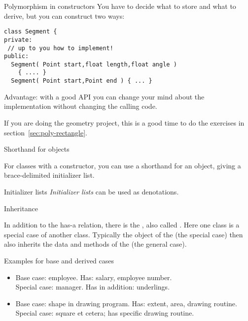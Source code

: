 \begin{slide}{Polymorphism in constructors}
  \label{sl:obj-poly-construct}
  You have to decide what to store and what to derive, but you can
  construct two ways:
\begin{lstlisting}
class Segment {
private:
 // up to you how to implement!
public:
  Segment( Point start,float length,float angle )
    { .... }
  Segment( Point start,Point end ) { ... }
\end{lstlisting}
Advantage: with a good API you can change your mind about the
implementation without changing the calling code.
\end{slide}

\begin{exercise}
  If you are doing the geometry project, this is a good time to
  do the exercises in section~\ref{sec:poly-rectangle}.
\end{exercise}

 {Shorthand for objects}

For classes with a constructor, you can use a shorthand
for an object, giving a brace-delimited initializer list.

\begin{block}{Initializer lists}
  \label{sl:class-inlist}
  \emph{Initializer lists} can be used as denotations.
\end{block}

 {Inheritance}
\label{sec:inheritance}

In addition to the has-a relation, there is the , also called . Here one class is
a special case of another class.
Typically the object of the  (the special
case) then also inherits the data and methods of the
 (the general case).

\begin{block}{Examples for base and derived cases}
  \label{sl:derived-example}
  \begin{itemize}
  \item Base case: employee. Has: salary, employee number.\\
    Special case: manager. Has in addition: underlings.
  \item Base case: shape in drawing program. Has: extent, area,
    drawing routine.\\
    Special case: square et cetera; has specific drawing routine.
  \end{itemize}  
\end{block}

